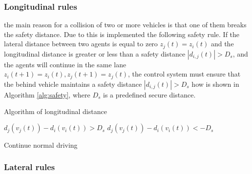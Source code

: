 \subsubsection{Longitudinal rules}
the main reason for a collision of two or more vehicles is that one of them breaks the safety distance. Due to this is implemented the following safety rule. If the lateral distance between two agents is equal to zero $z_j(t)=z_i(t) $ and the longitudinal distance is greater or less than a safety distance $\left| d_{i,j}(t) \right| > D_s$, and the agents will continue in the same lane $z_i(t+1) =  z_i(t), z_j(t+1) =  z_j(t)$, the control system must ensure that the behind vehicle maintains a safety distance $\left| d_{i,j}(t) \right| > D_s$ how is shown in Algorithm \ref{alg:safety}, where $D_s$ is a predefined secure distance.\\

\begin{algorithm}
\caption{Algorithm of longitudinal distance}\label{alg:safety}
\begin{algorithmic}
        \State $d_j(v_j(t)) -d_i(v_i(t)) > D_s$
        \State $d_j(v_j(t)) -d_i(v_i(t)) < -D_s$
    \Else
        
        \State Continue normal driving
    \EndIf
\EndIf

\end{algorithmic}
\end{algorithm}

\subsubsection{Lateral rules}

